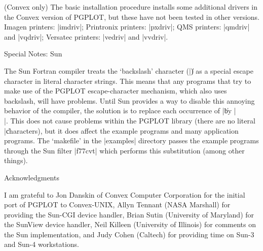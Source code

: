  (Convex only)
The basic installation procedure installs some additional drivers in the
Convex version of PGPLOT, but these have not been tested in other
versions. Imagen printers: |imdriv|; Printronix printers: |pxdriv|; QMS
printers: |qmdriv| and |vqdriv|; Versatec printers: |vedriv| and
|vvdriv|.

\beginsection Special Notes: Sun

The Sun Fortran compiler treats the `backslash' character (|\|) 
as a special escape character in literal character strings. This means 
that any programs that try to make use of the PGPLOT escape-character 
mechanism, which also uses backslash, will have problems.  Until Sun 
provides a way to disable this annoying behavior of the compiler, the
solution is to replace each occurrence of |\| by |\\|. This does not
cause problems within the PGPLOT library (there are no literal |\|
characters), but it does affect the example programs and many
application programs.  The `makefile' in the |examples| directory passes
the example programs through the Sun filter |f77cvt| which performs this
substitution (among other things).

\beginsection Acknowledgments

I am grateful to Jon Danskin of Convex Computer Corporation for the 
initial port of PGPLOT to Convex-UNIX, Allyn Tennant (NASA Marshall) for 
providing the Sun-CGI device handler, Brian Sutin (University of 
Maryland) for the SunView device handler, Neil Killeen (University of 
Illinois) for comments on the Sun implementation, and Judy Cohen 
(Caltech) for providing time on Sun-3 and Sun-4 workstations. 

\bigskip
{}

\endchapter
